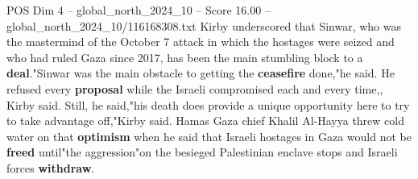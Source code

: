 \begin{textsample}{POS Dim 4 – global\_north\_2024\_10 – Score 16.00 – global\_north\_2024\_10/116168308.txt}
Kirby underscored that Sinwar, who was the mastermind of the October 7 attack in which the hostages were seized and who had ruled Gaza since 2017, has been the main stumbling block to a \textbf{deal}."Sinwar was the main obstacle to getting the \textbf{ceasefire} done,"he said.
He refused every \textbf{proposal} while the Israeli compromised each and every time,, Kirby said.
Still, he said,"his death does provide a unique opportunity here to try to take advantage off,"Kirby said.
Hamas Gaza chief Khalil Al-Hayya threw cold water on that \textbf{optimism} when he said that Israeli hostages in Gaza would not be \textbf{freed} until"the aggression"on the besieged Palestinian enclave stops and Israeli forces \textbf{withdraw}.

\end{textsample}
